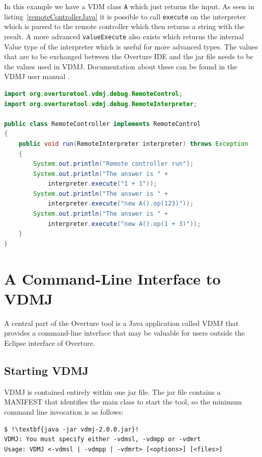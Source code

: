 \documentclass{overturerepsec}
\begin{document}
In this example we have a VDM class \texttt{A} which just returns the input. As
seen in listing~\ref{remoteControllerJava} it is possible to call
\texttt{execute} on the interpreter which is parsed to the remote
controller which then returns a string with the result. A more
advanced \texttt{valueExecute} also exists which returns the internal
Value type of the interpreter which is useful for more advanced
types. The
values that are to be exchanged between the Overture IDE and the jar
file needs to be the values used in VDMJ. Documentation about these
can be found in the VDMJ user manual \cite{Battle09}.

\begin{lstlisting}[language=JAVA,label=remoteControllerJava,caption=Remote Controller Java class,captionpos=b]
import org.overturetool.vdmj.debug.RemoteControl;
import org.overturetool.vdmj.debug.RemoteInterpreter;

public class RemoteController implements RemoteControl
{
	public void run(RemoteInterpreter interpreter) throws Exception
	{
		System.out.println("Remote controller run");
		System.out.println("The answer is " + 
			interpreter.execute("1 + 1")); 
		System.out.println("The answer is " + 
			interpreter.execute("new A().op(123)")); 
		System.out.println("The answer is " + 
			interpreter.execute("new A().op(1 + 3)")); 
	}
}
\end{lstlisting}

\section{A Command-Line Interface to VDMJ}\label{sec:commandline}

A central part of the Overture tool is a Java application
called VDMJ that provides a command-line interface that may be valuable
for users outside the Eclipse interface of Overture.

\subsection{Starting VDMJ}

VDMJ is contained entirely within one jar file. The jar
file contains a MANIFEST that identifies the main class to start the
tool, so the minimum command line invocation is as follows:

\lstset{style=tool,language=}
\begin{lstlisting}
$ !\textbf{java -jar vdmj-2.0.0.jar}!
VDMJ: You must specify either -vdmsl, -vdmpp or -vdmrt
Usage: VDMJ <-vdmsl | -vdmpp | -vdmrt> [<options>] [<files>]
\end{lstlisting}
\lstset{style=mystyle}
\lstset{language=VDM++}
\end{document}

